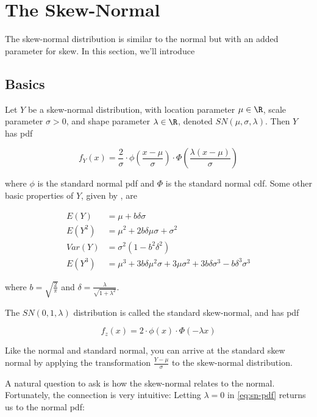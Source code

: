 \documentclass{article}
\begin{document}
\section{The Skew-Normal}

The skew-normal distribution is similar to the normal but with an added
parameter for skew. In this section, we'll introduce

\subsection{Basics}

Let $Y$ be a skew-normal distribution, with location parameter $\mu \in \R$,
scale parameter $\sigma > 0$, and shape parameter $\lambda \in \R$, denoted
$SN(\mu, \sigma, \lambda)$. Then $Y$ has pdf

\begin{equation} \label{eq:sn-pdf}
  f_Y(x) = \frac2\sigma \cdot \phi \left( \frac{x-\mu}{\sigma} \right) \cdot \Phi \left( \frac{\lambda(x-\mu)}{\sigma} \right)
\end{equation}

where $\phi$ is the standard normal pdf and $\Phi$ is the standard normal cdf.
Some other basic properties of $Y$, given by \citet{pewsey}, are

\begin{align}
  E(Y) &= \mu + b \delta \sigma \nonumber \\
  E(Y^2) &= \mu^2 + 2b \delta \mu \sigma + \sigma^2 \label{eq:sn-basic-properties} \\
  Var(Y) &= \sigma^2 (1 - b^2 \delta^2) \nonumber \\
  E(Y^3) &= \mu^3 + 3 b \delta \mu^2 \sigma + 3 \mu \sigma^2 + 3 b \delta \sigma^3 - b \delta^3 \sigma^3 \nonumber
\end{align}

where $b = \sqrt{\frac{2}{\pi}}$ and $\delta = \frac{\lambda}{\sqrt{1 +
\lambda^2}}$.

The $SN(0,1,\lambda)$ distribution is called the standard skew-normal, and has
pdf

\begin{equation} \label{eq:standard-sn-pdf}
  f_z(x) = 2 \cdot \phi(x) \cdot \Phi (-\lambda x)
\end{equation}

Like the normal and standard normal, you can arrive at the standard skew normal
by applying the transformation $\frac{Y - \mu}{\sigma}$ to the skew-normal
distribution.

A natural question to ask is how the skew-normal relates to the normal.
Fortunately, the connection is very intuitive: Letting $\lambda = 0$ in
\eqref{eq:sn-pdf} returns us to the normal pdf:
\end{document}
